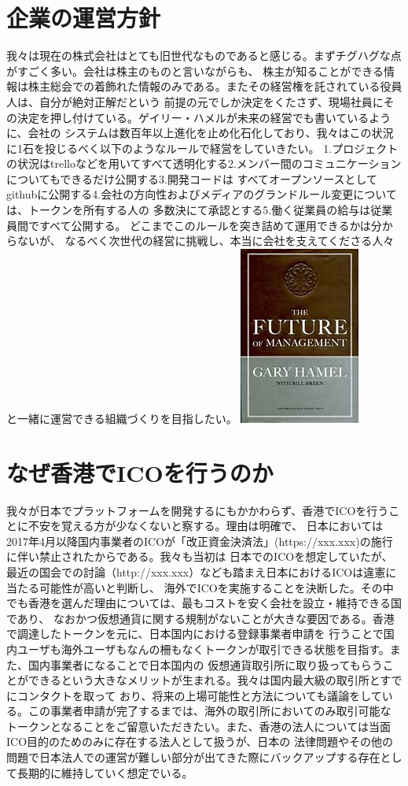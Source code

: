 \documentclass{jsarticle}
\begin{document}
\section{企業の運営方針}
我々は現在の株式会社はとても旧世代なものであると感じる。まずチグハグな点がすごく多い。会社は株主のものと言いながらも、
株主が知ることができる情報は株主総会での着飾れた情報のみである。またその経営権を託されている役員人は、自分が絶対正解だという
前提の元でしか決定をくたさず、現場社員にその決定を押し付けている。ゲイリー・ハメルが未来の経営でも書いているように、会社の
システムは数百年以上進化を止め化石化しており、我々はこの状況に1石を投じるべく以下のようなルールで経営をしていきたい。
1.プロジェクトの状況はtrelloなどを用いてすべて透明化する2.メンバー間のコミュニケーションについてもできるだけ公開する3.開発コードは
すべてオープンソースとしてgithubに公開する4.会社の方向性およびメディアのグランドルール変更については、トークンを所有する人の
多数決にて承認とする5.働く従業員の給与は従業員間ですべて公開する。 どこまでこのルールを突き詰めて運用できるかは分からないが、
なるべく次世代の経営に挑戦し、本当に会社を支えてくださる人々と一緒に運営できる組織づくりを目指したい。
	\includegraphics[scale=0.4]{img/thefutureofmanagement.jpg}
\section{なぜ香港でICOを行うのか}
我々が日本でプラットフォームを開発するにもかかわらず、香港でICOを行うことに不安を覚える方が少なくないと察する。理由は明確で、
日本においては2017年4月以降国内事業者のICOが「改正資金決済法」(https://xxx.xxx)の施行に伴い禁止されたからである。我々も当初は
日本でのICOを想定していたが、最近の国会での討論（http://xxx.xxx）なども踏まえ日本におけるICOは違憲に当たる可能性が高いと判断し、
海外でICOを実施することを決断した。その中でも香港を選んだ理由については、最もコストを安く会社を設立・維持できる国であり、
なおかつ仮想通貨に関する規制がないことが大きな要因である。香港で調達したトークンを元に、日本国内における登録事業者申請を
行うことで国内ユーザも海外ユーザもなんの柵もなくトークンが取引できる状態を目指す。また、国内事業者になることで日本国内の
仮想通貨取引所に取り扱ってもらうことができるという大きなメリットが生まれる。我々は国内最大級の取引所とすでにコンタクトを取って
おり、将来の上場可能性と方法についても議論をしている。この事業者申請が完了するまでは、海外の取引所においてのみ取引可能な
トークンとなることをご留意いただきたい。また、香港の法人については当面ICO目的のためのみに存在する法人として扱うが、日本の
法律問題やその他の問題で日本法人での運営が難しい部分が出てきた際にバックアップする存在として長期的に維持していく想定でいる。
\end{document}
